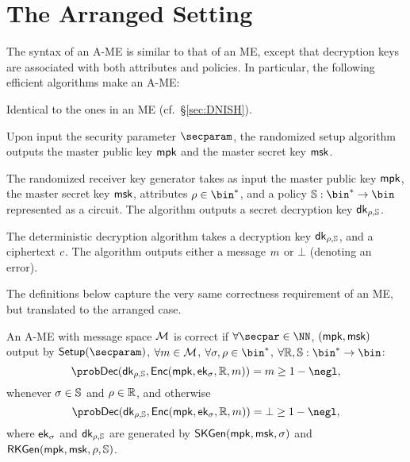 \section{The Arranged Setting}
The syntax of an A-ME is similar to that of an ME, except that decryption keys are associated with both attributes and policies. In particular,
the following efficient algorithms make an A-ME:
\begin{description}\label{def:snish_syntax}

    \item[$\skgen,\enc$:] Identical to the ones in an ME (cf.\ \S\ref{sec:DNISH}).

    \item[$\setup$:] Upon input the security parameter $\secparam$, the randomized setup algorithm outputs the master public key $\mathsf{mpk}$ and the master secret key $\mathsf{msk}$.

    \item[$\rkgen(\msk, \rattr, \saccess)$:] The randomized receiver key generator takes as input the master public key $\mathsf{mpk}$, the master secret key $\mathsf{msk}$, attributes $\rattr \in \bin^*$, and a policy $\saccess:\bin^*\rightarrow\bin$ represented as a circuit. The algorithm outputs a secret decryption key $\mathsf{dk}_{\rho,\mathbb{S}}$.

    \item[$\dec(\dk_{\rattr, \saccess}, \cipher)$] The deterministic decryption algorithm takes a decryption  key $\mathsf{dk}_{\rho,\mathbb{S}}$, and a ciphertext $c$.
          The algorithm outputs either a message $m$ or $\bot$ (denoting an error).
\end{description}

The definitions below capture the very same correctness requirement of an ME, but translated to the arranged case.

\begin{definition}[Correctness of A-ME]\label{def:SNISHcorrectness}
    An A-ME with message space $\mathcal{M}$ is correct if
    $\forall \secpar \in \NN$, $(\mathsf{mpk},\mathsf{msk})$ output by $\setup(\secparam)$, $\forall m\in \mathcal{M}$, $\forall \sattr,\rattr \in \bin^*$, $\forall \raccess,\saccess:\bin^* \rightarrow \bin$:
    \[
        \Prob{\dec(\dk_{\rattr,\saccess}, \enc(\mpk, \ek_{\sattr}, \raccess, \msg)) = \msg} \geq 1 - \negl,
    \]
    whenever $\sigma \in \mathbb{S}$ and $\rho \in \mathbb{R}$, and otherwise
    \[
        \Prob{\dec(\dk_{\rattr,\saccess}, \enc(\mpk, \ek_{\sattr}, \raccess, \msg)) = \bot} \geq 1 - \negl,
    \]
    where $\mathsf{ek}_{\sigma}$ and $\mathsf{dk}_{\rho,\mathbb{S}}$ are generated by $\mathsf{SKGen}(\mathsf{mpk}, \mathsf{msk}, \sigma)$ and $\mathsf{RKGen}(\mathsf{mpk}, \mathsf{msk}, \rho, \allowbreak\mathbb{S})$.
\end{definition}
